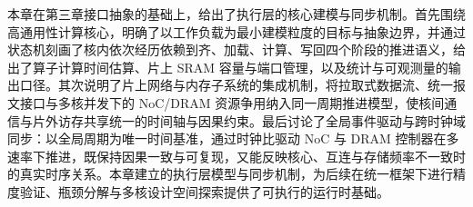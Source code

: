 
本章在第三章接口抽象的基础上，给出了执行层的核心建模与同步机制。首先围绕高通用性计算核心，明确了以工作负载为最小建模粒度的目标与抽象边界，并通过状态机刻画了核内依次经历依赖到齐、加载、计算、写回四个阶段的推进语义，给出了算子计算时间估算、片上 SRAM 容量与端口管理，以及统计与可观测量的输出口径。其次说明了片上网络与内存子系统的集成机制，将拉取式数据流、统一报文接口与多核并发下的 NoC/DRAM 资源争用纳入同一周期推进模型，使核间通信与片外访存共享统一的时间轴与因果约束。最后讨论了全局事件驱动与跨时钟域同步：以全局周期为唯一时间基准，通过时钟比驱动 NoC 与 DRAM 控制器在多速率下推进，既保持因果一致与可复现，又能反映核心、互连与存储频率不一致时的真实时序关系。本章建立的执行层模型与同步机制，为后续在统一框架下进行精度验证、瓶颈分解与多核设计空间探索提供了可执行的运行时基础。
